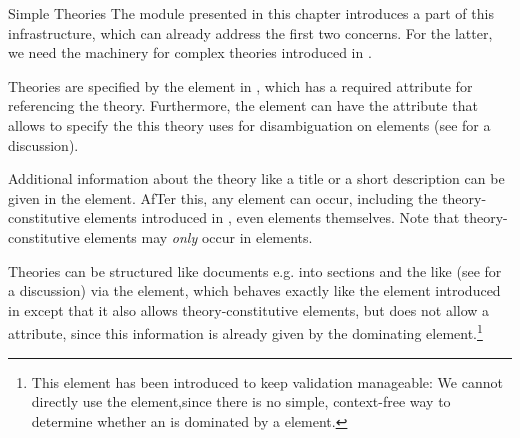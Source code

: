 \begin{module}[id=theories]
\begin{omgroup}{Simple Theories}
The module {}
presented in this chapter introduces a part of this infrastructure, which can already
address the first two concerns. For the latter, we need the machinery for complex theories
introduced in .

\begin{definition}[id=theory.def]
  Theories are specified by the {} element in \omdoc, which has a required
   attribute for referencing the theory. Furthermore,
  the  element can have the 
  attribute that allows to specify the  this theory uses for
  disambiguation on  elements (see  for a
  discussion).
\end{definition}
Additional information about the theory like a title or a short description can be given
in the  element. AfTer this, any {} \omdoc
element can occur, including the theory-constitutive elements introduced in
{}, even  elements
themselves. Note that theory-constitutive elements may {\emph{only}} occur in
 elements.

\begin{definition}[id=tgroup.def]
  Theories can be structured like documents e.g. into sections and the like (see
   for a discussion) via the {} element, which behaves
  exactly like the  element introduced in  except that
  it also allows theory-constitutive elements, but does not allow a
   attribute, since this information is already given by the
  dominating  element.\footnote{This element has been introduced to keep
    \omdoc validation manageable: We cannot directly use the 
    element,since there is no simple, context-free way to determine whether an
     is dominated by a  element.}
\end{definition}  


\end{omgroup}
\end{module}
